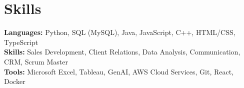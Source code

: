 \documentclass[11pt]{article}       %
\begin{document}
\vspace{-18.5pt}


\section*{Skills}
\textbf{Languages:} Python, SQL (MySQL), Java, JavaScript, C++, HTML/CSS, TypeScript\\
\textbf{Skills:} Sales Development, Client Relations, Data Analysis, Communication, CRM, Scrum Master\\
\textbf{Tools:} Microsoft Excel, Tableau, GenAI, AWS Cloud Services, Git, React, Docker\\

\vspace{-6.5pt}
\end{document}
